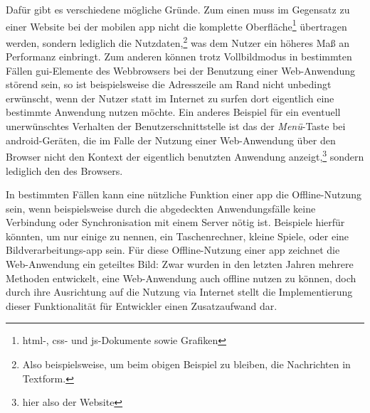 Dafür gibt es verschiedene mögliche Gründe. Zum einen muss im Gegensatz zu einer Website bei der mobilen \gls{app} nicht die komplette Oberfläche\footnote{\gls{html}-, \gls{css}- und \gls{js}-Dokumente sowie Grafiken} übertragen werden, sondern lediglich die Nutzdaten,\footnote{Also beispielsweise, um beim obigen Beispiel zu bleiben, die Nachrichten in Textform.} was dem Nutzer ein höheres Maß an Performanz einbringt.
Zum anderen können trotz Vollbildmodus in bestimmten Fällen \gls{gui}-Elemente des Webbrowsers bei der Benutzung einer Web-Anwendung störend sein, so ist beispielsweise die Adresszeile am Rand nicht unbedingt erwünscht, wenn der Nutzer statt im Internet zu surfen dort eigentlich eine bestimmte Anwendung nutzen möchte. 
Ein anderes Beispiel für ein eventuell unerwünschtes Verhalten der Benutzerschnittstelle ist das der \emph{Menü}-Taste bei \gls{android}-Geräten, die im Falle der Nutzung einer Web-Anwendung über den Browser nicht den Kontext der eigentlich benutzten Anwendung anzeigt,\footnote{hier also der Website} sondern lediglich den des Browsers.

In bestimmten Fällen kann eine nützliche Funktion einer \gls{app} die Offline-Nutzung sein, wenn beispielsweise durch die abgedeckten Anwendungsfälle keine Verbindung oder Synchronisation mit einem Server nötig ist. Beispiele hierfür könnten, um nur einige zu nennen, ein Taschenrechner, kleine Spiele, oder eine Bildverarbeitungs-\gls{app} sein. 
Für diese Offline-Nutzung einer \gls{app} zeichnet die Web-Anwendung ein geteiltes Bild: Zwar wurden in den letzten Jahren mehrere Methoden entwickelt, eine Web-Anwendung auch offline nutzen zu können, doch durch ihre Ausrichtung auf die Nutzung via Internet stellt die Implementierung dieser Funktionalität für Entwickler einen Zusatzaufwand dar. 

